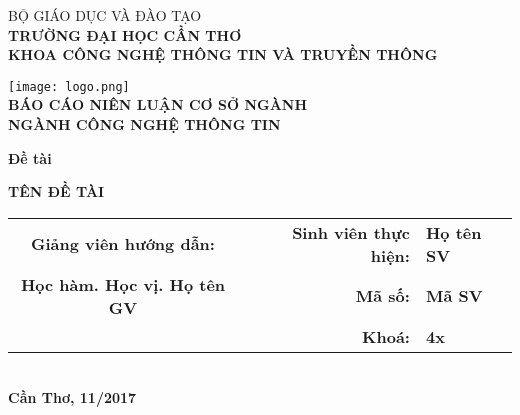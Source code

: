 \documentclass[../thesis.tex]{subfiles}
\begin{document}
\begin{titlepage}

\begin{center}

BỘ GIÁO DỤC VÀ ĐÀO TẠO\\
\textbf{TRƯỜNG ĐẠI HỌC CẦN THƠ\\}
\textbf{KHOA CÔNG NGHỆ THÔNG TIN VÀ TRUYỀN THÔNG\\[1cm]}

\texttt{[image: logo.png]}\\[1cm]

\textbf{BÁO CÁO NIÊN LUẬN CƠ SỞ NGÀNH\\}
\textbf{NGÀNH CÔNG NGHỆ THÔNG TIN\\[2cm]}

\begin{large}
\textbf{Đề tài\\[0.5cm]}
\end{large}
\textbf{{\LARGE TÊN ĐỀ TÀI}}
\\[4cm]

\begin{tabular}{ c c r l }
 \textbf{Giảng viên hướng dẫn:} & & \textbf{Sinh viên thực hiện:} & \textbf{Họ tên SV}\\ 
 \textbf{Học hàm. Học vị. Họ tên GV} & & \textbf{Mã số:} & \textbf{Mã SV}\\  
 & & \textbf{Khoá:} & \textbf{4x}
\end{tabular}
\\[4cm]

\textbf{Cần Thơ, 11/2017}

\end{center}

\end{titlepage}
\end{document}
